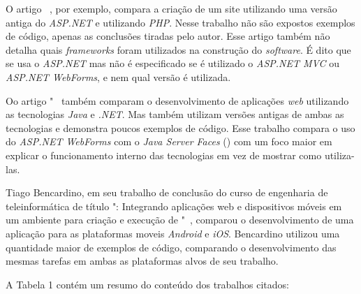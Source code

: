 O artigo ~\cite{14}, por exemplo, compara a criação de um site utilizando uma versão antiga do \textit{ASP.NET} e utilizando \textit{PHP}. 
Nesse trabalho não são expostos exemplos de código, apenas as conclusões tiradas pelo autor. 
Esse artigo também não detalha quais \textit{frameworks} foram utilizados na construção do \textit{software}. 
É dito que se usa o \textit{ASP.NET} mas não é especificado se é utilizado o \textit{ASP.NET MVC} ou \textit{ASP.NET WebForms}, e nem qual versão é utilizada. 

Oo artigo "~\cite{15} também comparam o desenvolvimento de aplicações \textit{web} utilizando as tecnologias \textit{Java} e \textit{.NET}. 
Mas também utilizam versões antigas de ambas as tecnologias e demonstra poucos exemplos de código. Esse trabalho compara o uso do \textit{ASP.NET WebForms} com o \textit{Java Server Faces} () 
com um foco maior em explicar o funcionamento interno das tecnologias em vez de mostrar como utiliza-las.

Tiago Bencardino, em seu trabalho de conclusão do curso de engenharia de teleinformática de título ": Integrando aplicações web e dispositivos móveis em um ambiente para criação e execução de "~\cite{16}, 
comparou o desenvolvimento de uma aplicação para as plataformas moveis \textit{Android} e \textit{iOS}. Bencardino utilizou uma quantidade maior de exemplos de código, comparando o desenvolvimento das mesmas tarefas em ambas as plataformas alvos de seu trabalho.

A Tabela 1 contém um resumo do conteúdo dos trabalhos citados:

\begin{table}[h!]   
    \centering
\end{table}

